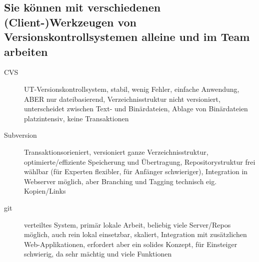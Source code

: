 \documentclass[a4paper]{article}
\begin{document}
		\subsection{Sie können mit verschiedenen (Client-)Werkzeugen von Versionskontrollsystemen alleine und im Team arbeiten}
		
		\begin{description}
			\item[CVS] UT-Versionskontrollsystem, stabil, wenig Fehler, einfache Anwendung, ABER nur dateibasierend, Verzeichnisstruktur nicht versioniert, unterscheidet zwischen Text- und Binärdateien, Ablage von Binärdateien platzintensiv, keine Transaktionen
			\item[Subversion] Transaktionsorieniert, versioniert ganze Verzeichnisstruktur, optimierte/effiziente Speicherung und Übertragung, Repositorystruktur frei wählbar (für Experten flexibler, für Anfänger schwieriger), Integration in Webserver möglich, aber Branching und Tagging technisch eig. Kopien/Links
			\item[git] verteiltes System, primär lokale Arbeit, beliebig viele Server/Repos möglich, auch rein lokal einsetzbar, skaliert, Integration mit zusätzlichen Web-Applikationen, erfordert aber ein solides Konzept, für Einsteiger schwierig, da sehr mächtig und viele Funktionen
		\end{description}
		
\end{document}
